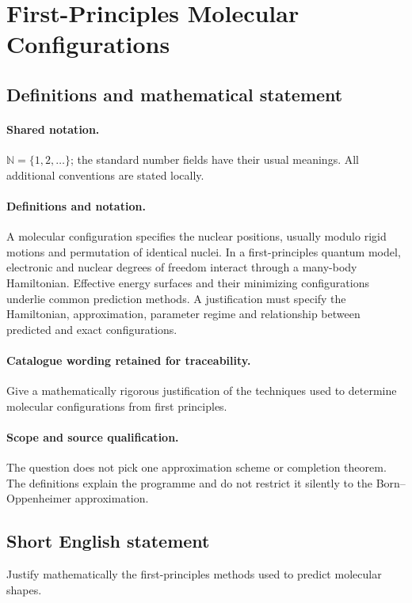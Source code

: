 \documentclass[11pt]{article}
\begin{document}
\section{First-Principles Molecular Configurations}\label{statement}

\subsection{Definitions and mathematical statement}

\paragraph{Shared notation.}$\mathbb N=\{1,2,\ldots\}$; the standard number fields have their usual meanings. All additional conventions are stated locally.


\paragraph{Definitions and notation.}A molecular configuration specifies the nuclear positions, usually modulo rigid motions and permutation of identical nuclei. In a first-principles quantum model, electronic and nuclear degrees of freedom interact through a many-body Hamiltonian. Effective energy surfaces and their minimizing configurations underlie common prediction methods. A justification must specify the Hamiltonian, approximation, parameter regime and relationship between predicted and exact configurations.

\paragraph{Catalogue wording retained for traceability.}
Give a mathematically rigorous justification of the techniques used to determine molecular configurations from first principles.
\paragraph{Scope and source qualification.}The question does not pick one approximation scheme or completion theorem. The definitions explain the programme and do not restrict it silently to the Born--Oppenheimer approximation.
\subsection{Short English statement}
Justify mathematically the first-principles methods used to predict molecular shapes.
\end{document}
